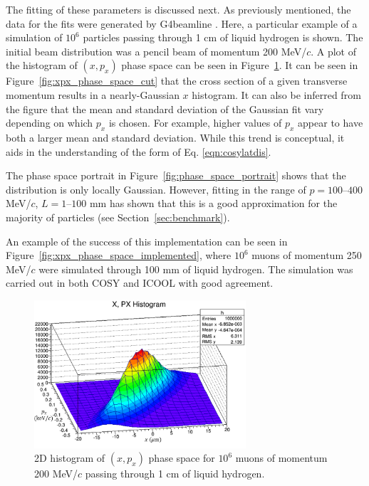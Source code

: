 The fitting of these parameters is discussed next. As previously mentioned, the data for the fits were generated by G4beamline \cite{g4bl}. Here, a particular example of a simulation of $10^6$ particles passing through 1 cm of liquid hydrogen is shown. The initial beam distribution was a pencil beam of momentum 200 MeV/$c$. A plot of the histogram of $(x,p_x)$ phase space can be seen in Figure~\ref{fig:xpx_phase_space}. It can be seen in Figure~\ref{fig:xpx_phase_space_cut} that the cross section of a given transverse momentum results in a nearly-Gaussian $x$ histogram. It can also be inferred from the figure that the mean and standard deviation of the Gaussian fit vary depending on which $p_x$ is chosen. For example, higher values of $p_x$ appear to have both a larger mean and standard deviation. While this trend is conceptual, it aids in the understanding of the form of Eq. \eqref{eqn:cosylatdis}.

The phase space portrait in Figure~\ref{fig:phase_space_portrait} shows that the distribution is only locally Gaussian. However, fitting in the range of $p=100\text{--}400$ MeV/$c$, $L=1\text{--}100$ mm has shown that this is a good approximation for the majority of particles (see Section~\ref{sec:benchmark}).

An example of the success of this implementation can be seen in Figure~\ref{fig:xpx_phase_space_implemented}, where $10^6$ muons of momentum 250 MeV/$c$ were simulated through 100 mm of liquid hydrogen. The simulation was carried out in both COSY and ICOOL \cite{icool} with good agreement.

\begin{figure}[H]
  \centering
    \includegraphics[width=0.7\textwidth]{Figures/xpx_phase_space} 
  \caption[2D histogram of $(x,p_x)$ phase space.]{2D histogram of $(x,p_x)$ phase space for $10^6$ muons of momentum 200 MeV/$c$ passing through 1 cm of liquid hydrogen.}
  \label{fig:xpx_phase_space}
\end{figure}

